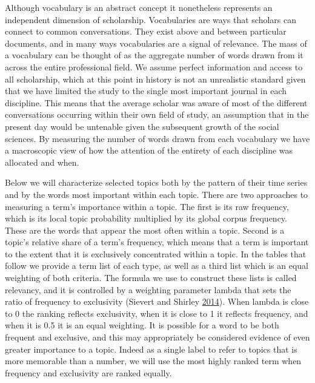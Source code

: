 \documentclass[]{book}
\theoremstyle{definition}
\theoremstyle{definition}
\theoremstyle{definition}
\theoremstyle{remark}
\begin{document}
Although vocabulary is an abstract concept it nonetheless represents an
independent dimension of scholarship. Vocabularies are ways that
scholars can connect to common conversations. They exist above and
between particular documents, and in many ways vocabularies are a signal
of relevance. The mass of a vocabulary can be thought of as the
aggregate number of words drawn from it across the entire professional
field. We assume perfect information and access to all scholarship,
which at this point in history is not an unrealistic standard given that
we have limited the study to the single most important journal in each
discipline. This means that the average scholar was aware of most of the
different conversations occurring within their own field of study, an
assumption that in the present day would be untenable given the
subsequent growth of the social sciences. By measuring the number of
words drawn from each vocabulary we have a macroscopic view of how the
attention of the entirety of each discipline was allocated and when.

Below we will characterize selected topics both by the pattern of their
time series and by the words most important within each topic. There are
two approaches to measuring a term's importance within a topic. The
first is its raw frequency, which is its local topic probability
multiplied by its global corpus frequency. These are the words that
appear the most often within a topic. Second is a topic's relative share
of a term's frequency, which means that a term is important to the
extent that it is exclusively concentrated within a topic. In the tables
that follow we provide a term list of each type, as well as a third list
which is an equal weighting of both criteria. The formula we use to
construct these lists is called relevancy, and it is controlled by a
weighting parameter lambda that sets the ratio of frequency to
exclusivity (Sievert and Shirley
\protect\hyperlink{ref-Sievert2014LDAvis}{2014}). When lambda is close
to 0 the ranking reflects exclusivity, when it is close to 1 it reflects
frequency, and when it is 0.5 it is an equal weighting. It is possible
for a word to be both frequent and exclusive, and this may appropriately
be considered evidence of even greater importance to a topic. Indeed as
a single label to refer to topics that is more memorable than a number,
we will use the most highly ranked term when frequency and exclusivity
are ranked equally.
\end{document}
